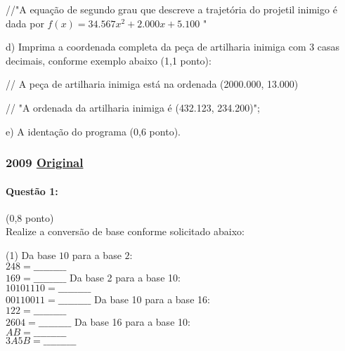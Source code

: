 \documentclass[12pt,a4paper]{article}
\newcommand{\original}[1]{\tiny \href{#1}{Original} \normalsize}
\begin{document}
\vspace{4mm}

//"A equação de segundo grau que descreve a trajetória do projetil inimigo é dada por $f(x) =
34.567 x^2 + 2.000 x + 5.100$ "

\vspace{4mm}

d) Imprima a coordenada completa da peça de artilharia inimiga com 3 casas decimais, conforme
exemplo abaixo (1,1 ponto):

\vspace{4mm}

// A peça de artilharia inimiga está na ordenada (2000.000, 13.000)

\vspace{4mm}

// "A ordenada da artilharia inimiga é (432.123, 234.200)";

\vspace{4mm}

e) A identação do programa (0,6 ponto).

\newpage
\subsubsection{2009 \original{https://drive.google.com/file/d/1TIAZpqabsvT8Dh59R7izADa1MDxonnuy/view?usp=sharing}}

\paragraph{Questão 1:}(0,8 ponto)\\
Realize a conversão de base conforme solicitado abaixo:
\begin{tasks}(1)
\task Da base $10$ para a base $2$:\\
$248=\_\_\_\_\_\_\_\_\_\_$\\
$169=\_\_\_\_\_\_\_\_\_\_$
\task Da base 2 para a base 10:\\
$10101110=\_\_\_\_\_\_\_\_\_\_$\\
$00110011=\_\_\_\_\_\_\_\_\_\_$
\task Da base 10 para a base 16:\\
$122=\_\_\_\_\_\_\_\_\_\_$\\
$2604=\_\_\_\_\_\_\_\_\_\_$
\task Da base 16 para a base 10:\\
$AB=\_\_\_\_\_\_\_\_\_\_$\\
$3A5B=\_\_\_\_\_\_\_\_\_\_$
\end{tasks}
\end{document}
